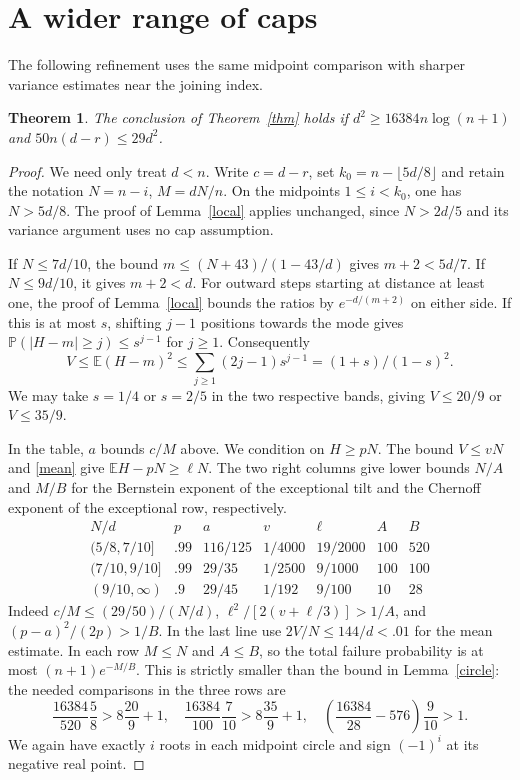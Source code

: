 \documentclass[11pt]{article}
\newtheorem{theorem}{Theorem}
\newcommand{\E}{\mathbb E}
\newcommand{\Prob}{\mathbb P}
\begin{document}
\section{A wider range of caps}
The following refinement uses the same midpoint comparison with sharper variance estimates near the joining index.
\begin{theorem}\label{wide}
The conclusion of Theorem~\ref{thm} holds if $d^2\ge16384n\log(n+1)$ and $50n(d-r)\le29d^2$.
\end{theorem}
\begin{proof}
We need only treat $d<n$. Write $c=d-r$, set $k_0=n-\lfloor5d/8\rfloor$ and retain the notation $N=n-i$, $M=dN/n$. On the midpoints $1\le i<k_0$, one has $N>5d/8$. The proof of Lemma~\ref{local} applies unchanged, since $N>2d/5$ and its variance argument uses no cap assumption.

If $N\le7d/10$, the bound $m\le(N+43)/(1-43/d)$ gives $m+2<5d/7$. If $N\le9d/10$, it gives $m+2<d$. For outward steps starting at distance at least one, the proof of Lemma~\ref{local} bounds the ratios by $e^{-d/(m+2)}$ on either side. If this is at most $s$, shifting $j-1$ positions towards the mode gives $\Prob(|H-m|\ge j)\le s^{j-1}$ for $j\ge1$. Consequently
\[
 V\le\E(H-m)^2\le\sum_{j\ge1}(2j-1)s^{j-1}=(1+s)/(1-s)^2.
\]
We may take $s=1/4$ or $s=2/5$ in the two respective bands, giving $V\le20/9$ or $V\le35/9$.

In the table, $a$ bounds $c/M$ above. We condition on $H\ge pN$. The bound $V\le vN$ and \eqref{mean} give $\E H-pN\ge \ell N$. The two right columns give lower bounds $N/A$ and $M/B$ for the Bernstein exponent of the exceptional tilt and the Chernoff exponent of the exceptional row, respectively.
\[
\begin{array}{c|cccc|cc}
 N/d & p & a & v & \ell & A & B\\\hline
 (5/8,7/10] & .99 &116/125 &1/4000 &19/2000 &100&520\\
 (7/10,9/10] & .99 &29/35 &1/2500 &9/1000 &100&100\\
 (9/10,\infty) & .9 &29/45 &1/192 &9/100 &10&28
\end{array}
\]
Indeed $c/M\le(29/50)/(N/d)$, $\ell^2/[2(v+\ell/3)]>1/A$, and $(p-a)^2/(2p)>1/B$. In the last line use $2V/N\le144/d<.01$ for the mean estimate. In each row $M\le N$ and $A\le B$, so the total failure probability is at most $(n+1)e^{-M/B}$. This is strictly smaller than the bound in Lemma~\ref{circle}: the needed comparisons in the three rows are
\[
 \frac{16384}{520}\frac58>8\frac{20}9+1,\quad
 \frac{16384}{100}\frac7{10}>8\frac{35}9+1,\quad
 \left(\frac{16384}{28}-576\right)\frac9{10}>1 .
\]
We again have exactly $i$ roots in each midpoint circle and sign $(-1)^i$ at its negative real point.


\end{proof}
\end{document}
